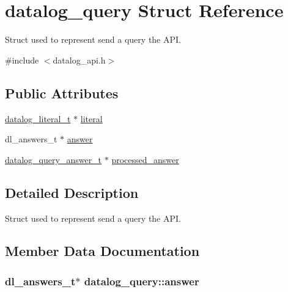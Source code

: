 \hypertarget{structdatalog__query}{}\section{datalog\+\_\+query Struct Reference}
\label{structdatalog__query}


Struct used to represent send a query the A\+PI.  




{\ttfamily \#include $<$datalog\+\_\+api.\+h$>$}

\subsection*{Public Attributes}
\begin{DoxyCompactItemize}
\item 
\hyperlink{datalog__api_8h_aeb86f46db4f8142eeb397d20f69f6487}{datalog\+\_\+literal\+\_\+t} $\ast$ \hyperlink{structdatalog__query_ae91a9dea687ce035816c38593d171e75}{literal}
\item 
dl\+\_\+answers\+\_\+t $\ast$ \hyperlink{structdatalog__query_a4b71bfe53acdc4a04a8816527127a078}{answer}
\item 
\hyperlink{datalog__api_8h_a34c189d3b3a5d5821691c8237e3922e6}{datalog\+\_\+query\+\_\+answer\+\_\+t} $\ast$ \hyperlink{structdatalog__query_a54e2eef2c18bc5e4c0f0a6c10f1e6397}{processed\+\_\+answer}
\end{DoxyCompactItemize}


\subsection{Detailed Description}
Struct used to represent send a query the A\+PI. 

\subsection{Member Data Documentation}
\subsubsection[{\texorpdfstring{answer}{answer}}]{\setlength{\rightskip}{0pt plus 5cm}dl\+\_\+answers\+\_\+t$\ast$ datalog\+\_\+query\+::answer}\hypertarget{structdatalog__query_a4b71bfe53acdc4a04a8816527127a078}{}\label{structdatalog__query_a4b71bfe53acdc4a04a8816527127a078}
